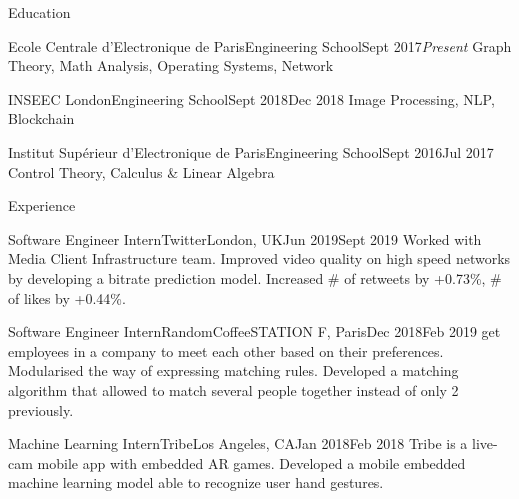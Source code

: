 \documentclass{resume}
\begin{document}
	\begin{rSection}{Education}
		\begin{school}{Ecole Centrale d'Electronique de Paris}{Engineering School}{Sept 2017}{\em Present}{
			Graph Theory, Math Analysis, Operating Systems, Network
		}
		\end{school}

		\begin{school}{INSEEC London}{Engineering School}{Sept 2018}{Dec 2018}{
			Image Processing, NLP, Blockchain
		}
		\end{school}

		\begin{school}{Institut Supérieur d'Electronique de Paris}{Engineering School}{Sept 2016}{Jul 2017}{
			Control Theory, Calculus \& Linear Algebra
		}
		\end{school}
	\end{rSection}

	\begin{rSection}{Experience}
		\begin{job}{Software Engineer Intern}{Twitter}{London, UK}{Jun 2019}{Sept 2019}{
			Worked with Media Client Infrastructure team. Improved video quality on high speed networks by developing a bitrate prediction model. Increased \# of retweets by +0.73\%, \# of likes by +0.44\%.
		}
		\end{job}

		\begin{job}{Software Engineer Intern}{RandomCoffee}{STATION F, Paris}{Dec 2018}{Feb 2019}{
			 get employees in a company to meet each other based on their preferences. Modularised the way of expressing matching rules. Developed a matching algorithm that allowed to match several people together instead of only 2 previously.
		}
		\end{job}

		\begin{job}{Machine Learning Intern}{Tribe}{Los Angeles, CA}{Jan 2018}{Feb 2018}{
			Tribe is a live-cam mobile app with embedded AR games. Developed a mobile embedded machine learning model able to recognize user hand gestures.
		}
		\end{job}
	\end{rSection}
\end{document}
